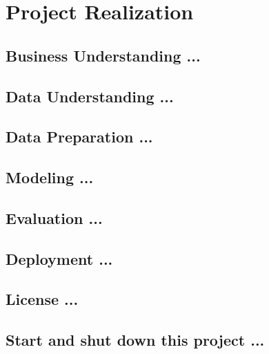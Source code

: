 \section{Project Realization}\label{sec:project-realization}

\subsection{Business Understanding ...}\label{subsec:businessunderstanding}

\subsection{Data Understanding ...}\label{subsec:dataunderstanding}

\subsection{Data Preparation ...}\label{subsec:datapreparation}

\subsection{Modeling ...}\label{subsec:modeling}

\subsection{Evaluation ...}\label{subsec:evaluation}

\subsection{Deployment ...}\label{subsec:deployment}

\subsection{License ...}\label{subsec:license}

\subsection{Start and shut down this project ...}\label{subsec:start-and-shut-down-this-project-...}
